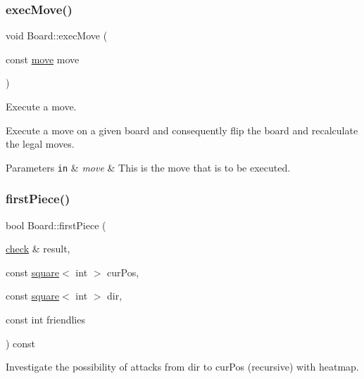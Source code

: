 \subsubsection{\texorpdfstring{exec\+Move()}{execMove()}}
{\footnotesize\ttfamily void Board\+::exec\+Move (\begin{DoxyParamCaption}\item[{const \hyperlink{structmove}{move}}]{move }\end{DoxyParamCaption})}



Execute a move. 

Execute a move on a given board and consequently flip the board and recalculate the legal moves. 
\begin{DoxyParams}[1]{Parameters}
\mbox{\tt in}  & {\em move} & This is the move that is to be executed. \\
\hline
\end{DoxyParams}
\mbox{\label{classBoard_a900420865c9acc6a18a9e25f94e3b72e}} 
\subsubsection{\texorpdfstring{first\+Piece()}{firstPiece()}}
{\footnotesize\ttfamily bool Board\+::first\+Piece (\begin{DoxyParamCaption}\item[{\hyperlink{structcheck}{check} \&}]{result,  }\item[{const \hyperlink{structsquare}{square}$<$ int $>$}]{cur\+Pos,  }\item[{const \hyperlink{structsquare}{square}$<$ int $>$}]{dir,  }\item[{const int}]{friendlies }\end{DoxyParamCaption}) const\hspace{0.3cm}{\ttfamily [private]}}



Investigate the possibility of attacks from dir to cur\+Pos (recursive) with heatmap. 


